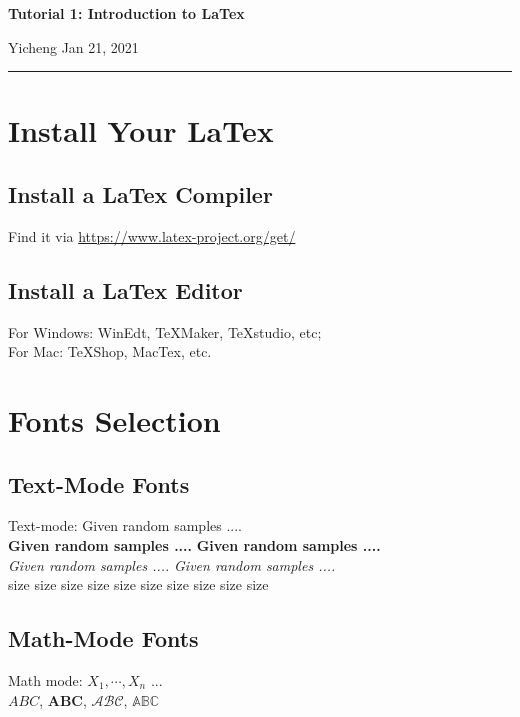 \documentclass[11pt]{article}
\theoremstyle{mytheoremstyle}
\begin{document}
\thispagestyle{empty}


\begin{center}
\bf\large Tutorial 1: Introduction to LaTex
\end{center}

\noindent
Yicheng  %
\hfill
Jan 21, 2021           %

\noindent
\rule{\textwidth}{1pt}

\medskip


\section{Install Your LaTex}

\subsection{Install a LaTex Compiler}
Find it via \url{https://www.latex-project.org/get/}

\subsection{Install a LaTex Editor}
For Windows: WinEdt, TeXMaker, TeXstudio, etc;\\
For Mac: TeXShop, MacTex, etc.

\section{Fonts Selection}
\subsection{Text-Mode Fonts}
Text-mode: Given random samples .... \\
\textbf{Given random samples ....} {\bf Given random samples ....}\\
\textit{Given random samples ....} {\it Given random samples ....}\\

{\tiny size} {\scriptsize size} {\footnotesize size} {\small size} size {\large size} {\Large size} {\LARGE size} {\huge size} {\Huge size}

\subsection{Math-Mode Fonts}
Math mode: $X_1,\cdots,X_n$ ... \\
$ABC$, $\mathbf{ABC}$,  $\mathcal{ABC}$,  $\mathbb{ABC}$
\end{document}
